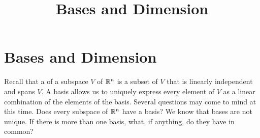 \documentclass{ximera}
\title{Bases and Dimension} \license{CC BY-NC-SA 4.0}
\begin{document}
\begin{abstract}

\end{abstract}
\maketitle

\section*{Bases and Dimension}
Recall that a  of a subspace $V$ of $\mathbb{R}^n$ is a subset of $V$ that is linearly independent and spans $V$.  A basis allows us to uniquely express every element of $V$ as a linear combination of the elements of the basis.  Several questions may come to mind at this time.  Does every subspace of $\mathbb{R}^n$ have a basis?  We know that bases are not unique.  If there is more than one basis, what, if anything, do they have in common?
\end{document}
